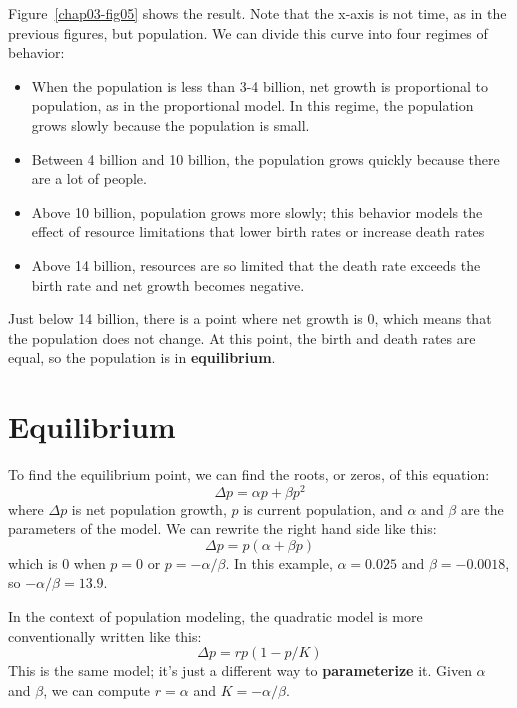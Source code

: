 \documentclass[12pt]{book}
\theoremstyle{exercise}
\begin{document}
Figure~\ref{chap03-fig05} shows the result.  Note that the x-axis is not time, as in the previous figures, but population.  We can divide this curve into four regimes of behavior:

\begin{itemize}

\item When the population is less than 3-4 billion, net growth is proportional to population, as in the proportional model.  In this regime,  the population grows slowly because the population is small.

\item Between 4 billion and 10 billion, the population grows quickly because there are a lot of people.

\item Above 10 billion, population grows more slowly; this behavior models the effect of resource limitations that lower birth rates or increase death rates

\item Above 14 billion, resources are so limited that the death rate exceeds the birth rate and net growth becomes negative.

\end{itemize}

Just below 14 billion, there is a point where net growth is 0, which means that the population does not change.  At this point, the birth and death rates are equal, so the population is in {\bf equilibrium}.



\section{Equilibrium}
\label{equilibrium}

To find the equilibrium point, we can find the roots, or zeros, of this equation:
%
\[ \Delta p = \alpha p + \beta p^2 \]
%
where $\Delta p$ is net population growth, $p$ is current population, and $\alpha$ and $\beta$ are the parameters of the model.  We can rewrite the right hand side like this:
%
\[ \Delta p = p (\alpha + \beta p) \]
%
which is $0$ when $p=0$ or $p=-\alpha/\beta$.  In this example, $\alpha = 0.025$ and $\beta = -0.0018$, so $-\alpha/\beta = 13.9$.

In the context of population modeling, the quadratic model is more conventionally written like this:
%
\[ \Delta p = r p (1 - p / K) \]
%
This is the same model; it's just a different way to {\bf parameterize} it.  Given $\alpha$ and $\beta$, we can compute $r=\alpha$ and $K=-\alpha/\beta$.
\end{document}
